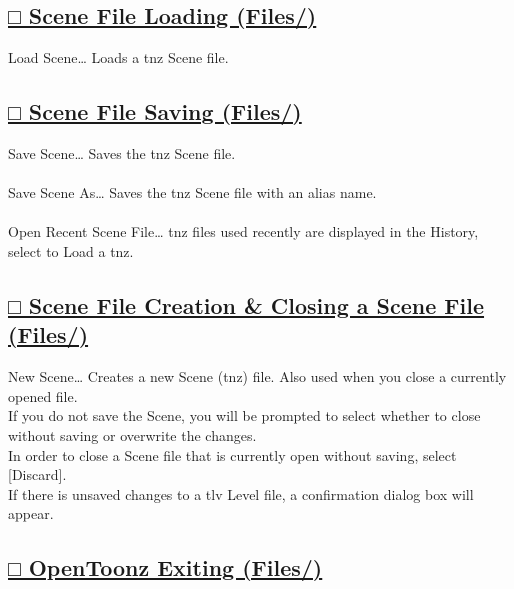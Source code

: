 \documentclass[a4paper,10pt]{article}
\begin{document}
\newpage

\newpage

\subsection*{\uline{□ Scene File Loading (Files/)}}

\noindent Load Scene… Loads a tnz Scene file.\\[-0.7em]

\subsection*{\uline{□ Scene File Saving (Files/)}}

\noindent Save Scene… Saves the tnz Scene file.\\
\\
Save Scene As… Saves the tnz Scene file with an alias name.\\
\\
Open Recent Scene File… tnz files used recently are displayed in the History, select to Load a tnz.\\

\subsection*{\uline{□ Scene File Creation \& Closing a Scene File (Files/)}}

\noindent New Scene… Creates a new Scene (tnz) file. Also used when you close a currently opened file.\\
\footnotesize
If you do not save the Scene, you will be prompted to select whether to close without saving or overwrite the changes.\\
In order to close a Scene file that is currently open without saving, select [Discard].\\
If there is unsaved changes to a tlv Level file, a confirmation dialog box will appear.\\

\subsection*{\uline{□ OpenToonz Exiting (Files/)}}
\end{document}
